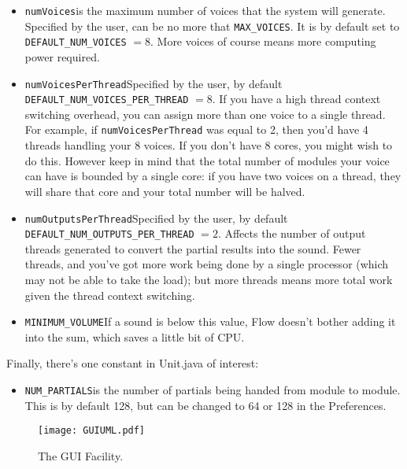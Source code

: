 \documentclass{article}
\begin{document}
\begin{itemize}
\item {\tt numVoices}\qquad is the maximum number of voices that the system will generate.  Specified by the user, can be no more that {\tt MAX\_VOICES}. It is by default set to {\tt DEFAULT\_NUM\_VOICES} \(=8\).  More voices of course means more computing power required.

\item {\tt numVoicesPerThread}\qquad Specified by the user, by default {\tt DEFAULT\_NUM\_VOICES\_PER\_THREAD} \(=8\).  If you have a high thread context switching overhead, you can assign more than one voice to a single thread.  For example, if {\tt numVoicesPerThread} was equal to 2, then you'd have 4 threads handling your 8 voices.  If you don't have 8 cores, you might wish to do this.  However keep in mind that the total number of modules your voice can have is bounded by a single core: if you have two voices on a thread, they will share that core and your total number will be halved.

\item {\tt numOutputsPerThread}\qquad Specified by the user, by default {\tt DEFAULT\_NUM\_OUTPUTS\_PER\_THREAD} \(=2\).  Affects the number of output threads generated to convert the partial results into the sound.  Fewer threads, and you've got more work being done by a single processor (which may not be able to take the load); but more threads means more total work given the thread context switching.

\item {\tt MINIMUM\_VOLUME}\qquad If a sound is below this value, Flow doesn't bother adding it into the sum, which saves a little bit of CPU.

\end{itemize}

Finally, there's one constant in Unit.java of interest:

\begin{itemize}
\item {\tt NUM\_PARTIALS}\qquad is the number of partials being handed from module to module.  This is by default 128, but can be changed to 64 or 128 in the Preferences. 
\end{itemize}

\begin{figure}[t]
\begin{center}\texttt{[image: GUIUML.pdf]}\end{center}
\caption{The GUI Facility.}
\label{gui}
\end{figure}
\end{document}
